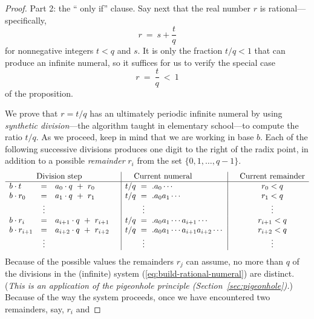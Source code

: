 \begin{proof}
\bigskip

\noindent
{\small\sf Part 2: the `` only if'' clause.}
Say next that the real number $r$ is rational---specifically,
\[ r \ = \ s + \frac{t}{q} \]
for nonnegative integers $t < q$ and $s$.  It is only the fraction
$t/q < 1$ that can produce an infinite numeral, so it suffices for us
to verify the special case
\[ r \ = \ \frac{t}{q} \ < \ 1 \]
of the proposition.

We prove that $r = t/q$ has an ultimately periodic infinite numeral by
using  {\it synthetic division}---the
algorithm taught in elementary school---to compute the ratio $t/q$.
As we proceed, keep in mind that we are working in base $b$.  Each of
the following successive divisions produces one digit to the right of
the radix point, in addition to a possible {\it remainder} $r_i$ from
the set $\{0, 1, \ldots, q-1\}$.
\begin{equation}
\label{eq:build-rational-numeral}
\begin{array}{lclc|l|cc}
\multicolumn{3}{c}{\mbox{Division step}} & &  \hspace*{.15in} \mbox{Current numeral} & &
\mbox{Current remainder} \\
\hline
b \cdot t   & = & a_0 \cdot q \ + \ r_0 &
      & t/q \ = \ .a_0 \cdots &
      & r_0 < q \\
b \cdot r_0 & = & a_1 \cdot q \ + \ r_1 &
      & t/q \ = \ .a_0 a_1 \cdots &
      & r_1 < q \\
            & \vdots &  & & \hspace*{.3in} \vdots &  & \vdots \\
b \cdot r_i & = & a_{i+1} \cdot q \ + \ r_{i+1} &
      & t/q \ = \ .a_0 a_1 \cdots a_{i+1} \cdots &
      & r_{i+1} < q \\
b \cdot r_{i+1} & = & a_{i+2} \cdot q \ + \ r_{i+2} &
      & t/q \ = \ .a_0 a_1 \cdots a_{i+1} a_{i+2} \cdots &
      & r_{i+2} < q \\
            & \vdots &  & &  \hspace*{.3in}\vdots & & \vdots   \\
\end{array}
\end{equation}
Because of the possible values the remainders $r_j$ can assume, no
more than $q$ of the divisions in the (infinite) system
(\ref{eq:build-rational-numeral}) are distinct.  ({\em This is an
  application of the pigeonhole principle
  (Section~\ref{sec:pigeonhole}).})  Because of the way the system
proceeds, once we have encountered two remainders, say, $r_i$ and

\end{proof}
